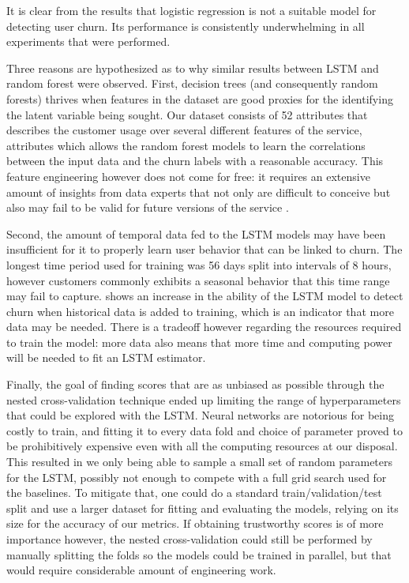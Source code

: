 \documentclass{kththesis}
\begin{document}
It is clear from the results that logistic regression is not a suitable model for detecting user churn. Its performance is consistently underwhelming in all experiments that were performed.

Three reasons are hypothesized as to why similar results between LSTM and random forest were observed. First, decision trees (and consequently random forests) thrives when features in the dataset are good proxies for the identifying the latent variable being sought. Our dataset consists of 52 attributes that describes the customer usage over several different features of the service, attributes which allows the random forest models to learn the correlations between the input data and the churn labels with a reasonable accuracy. This feature engineering however does not come for free: it requires an extensive amount of insights from data experts that not only are difficult to conceive but also may fail to be valid for future versions of the service .

Second, the amount of temporal data fed to the LSTM models may have been insufficient for it to properly learn user behavior that can be linked to churn. The longest time period used for training was 56 days split into intervals of 8 hours, however customers commonly exhibits a seasonal behavior that this time range may fail to capture.  shows an increase in the ability of the LSTM model to detect churn when historical data is added to training, which is an indicator that more data may be needed. There is a tradeoff however regarding the resources required to train the model: more data also means that more time and computing power will be needed to fit an LSTM estimator.

Finally, the goal of finding scores that are as unbiased as possible through the nested cross-validation technique ended up limiting the range of hyperparameters that could be explored with the LSTM. Neural networks are notorious for being costly to train, and fitting it to every data fold and choice of parameter proved to be prohibitively expensive even with all the computing resources at our disposal. This resulted in we only being able to sample a small set of random parameters for the LSTM, possibly not enough to compete with a full grid search used for the baselines. To mitigate that, one could do a standard train/validation/test split and use a larger dataset for fitting and evaluating the models, relying on its size for the accuracy of our metrics. If obtaining trustworthy scores is of more importance however, the nested cross-validation could still be performed by manually splitting the folds so the models could be trained in parallel, but that would require considerable amount of engineering work.
\end{document}
